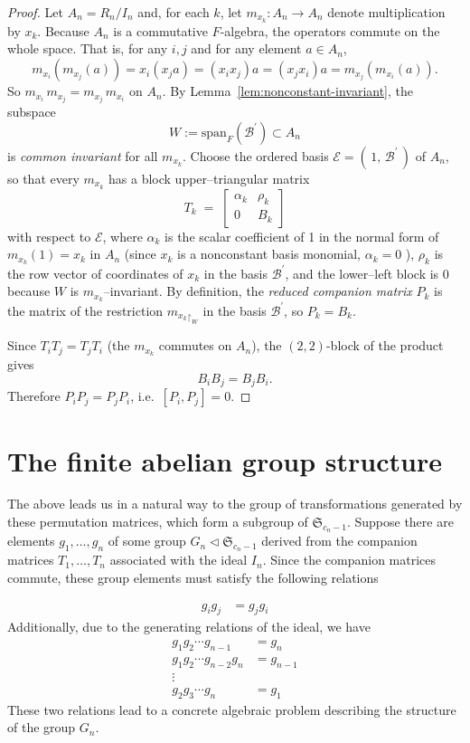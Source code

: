 \documentclass[11pt]{amsart}
\theoremstyle{plain}
\theoremstyle{definition}
\theoremstyle{remark}
\begin{document}
\begin{proof}
	Let $A_n=R_n/I_n$ and, for each $k$, let $m_{x_k}:A_n\to A_n$ denote multiplication by $x_k$.
	Because $A_n$ is a commutative $F$-algebra, the operators commute on the whole space. That is, for any \(i, j\) and for any element \(a \in A_n\),
	\[
	m_{x_i}(m_{x_j}(a)) = x_i(x_j a) = (x_i x_j)a = (x_j x_i)a = m_{x_j}(m_{x_i}(a)).
	\] 
    So \( m_{x_i}\,m_{x_j} = m_{x_j}\,m_{x_i} \) on \( A_n \). By Lemma~\ref{lem:nonconstant-invariant}, the subspace
	\[
	W := \mathrm{span}_F(\mathcal{B}^\prime)\subset A_n
	\]
	is \emph{common invariant} for all $m_{x_k}$. Choose the ordered basis \( \mathcal{E}=(\,1,\,\mathcal{B}^\prime\,) \) of $A_n$, so that every $m_{x_k}$ has a block upper–triangular matrix
	\[
	   T_k \;=\;
	\begin{bmatrix}
	\alpha_k & \rho_k \\
	0 & B_k
	\end{bmatrix}
	\]
	with respect to \(\mathcal{E}\), where \( \alpha_k \) is the scalar coefficient of 1 in the normal form of \(m_{x_k}(1)=x_k\) in \(A_n\) (since \(x_k\) is a nonconstant basis monomial, \( \alpha_k =0 \)  ), \( \rho_k \) is the row vector of coordinates of \(x_k\) in the basis \( \mathcal{B}^\prime \), and the lower–left block is $0$ because $W$ is $m_{x_k}$–invariant.
	By definition, the \emph{reduced companion matrix} $P_k$ is the matrix of the restriction $m_{x_k}\!_{\restriction_W}$ in the basis $\mathcal{B}^\prime$, so $P_k=B_k$.
	
	Since $T_iT_j=T_jT_i$ (the $m_{x_k}$ commutes on $A_n$), the $(2,2)$-block of the product gives
	\[
	B_iB_j = B_jB_i .
	\]
	Therefore $P_iP_j=P_jP_i$, i.e.\ $[P_i,P_j]=0$.
\end{proof}

\section{The finite abelian group structure}
\label{sec:fintegroup}
The above leads us in a natural way to the group of transformations generated by these permutation matrices, which form a subgroup of \( \mathfrak{S}_{c_n-1} \). Suppose there are elements \( g_1, \dots, g_n \) of some group \( G_n \lhd \mathfrak{S}_{c_n-1} \) derived from the companion matrices \( T_1, \dots, T_n \) associated with the ideal \(I_n\). Since the companion matrices commute, these group elements must satisfy the following relations

\begin{align}
g_ig_j & = g_jg_i  %
\end{align}
Additionally, due to the generating relations of the ideal, we have
\begin{align}
g_1g_2\cdots g_{n-1} & = g_n \nonumber\\ g_1g_2\cdots g_{n-2}g_n & = g_{n-1} \\ \vdots & \nonumber\\ g_2g_3\cdots g_n & = g_1 \nonumber %
\end{align} These two relations lead to a concrete algebraic problem describing the structure of the group \( G_n \).
\end{document}
